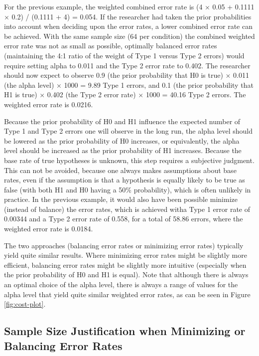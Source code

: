 \documentclass[
  english,
  ,man, a4paper,floatsintext]{apa6}
\begin{document}
For the previous example, the weighted combined error rate is (4 × 0.05 + 0.1111 × 0.2) / (0.1111 + 4) = 0.054. If the researcher had taken the prior probabilities into account when deciding upon the error rates, a lower combined error rate can be achieved. With the same sample size (64 per condition) the combined weighted error rate was not as small as possible, optimally balanced error rates (maintaining the 4:1 ratio of the weight of Type 1 versus Type 2 errors) would require setting alpha to 0.011 and the Type 2 error rate to 0.402. The researcher should now expect to observe 0.9 (the prior probability that H0 is true) × 0.011 (the alpha level) × 1000 = 9.89 Type 1 errors, and 0.1 (the prior probability that H1 is true) × 0.402 (the Type 2 error rate) × 1000 = 40.16 Type 2 errors. The weighted error rate is 0.0216.

Because the prior probability of H0 and H1 influence the expected number of Type 1 and Type 2 errors one will observe in the long run, the alpha level should be lowered as the prior probability of H0 increases, or equivalently, the alpha level should be increased as the prior probability of H1 increases. Because the base rate of true hypotheses is unknown, this step requires a subjective judgment. This can not be avoided, because one always makes assumptions about base rates, even if the assumption is that a hypothesis is equally likely to be true as false (with both H1 and H0 having a 50\% probability), which is often unlikely in practice. In the previous example, it would also have been possible minimize (instead of balance) the error rates, which is achieved witha Type 1 error rate of 0.00344 and a Type 2 error rate of 0.558, for a total of 58.86 errors, where the weighted error rate is 0.0184.

The two approaches (balancing error rates or minimizing error rates) typically yield quite similar results. Where minimizing error rates might be slightly more efficient, balancing error rates might be slightly more intuitive (especially when the prior probability of H0 and H1 is equal). Note that although there is always an optimal choice of the alpha level, there is always a range of values for the alpha level that yield quite similar weighted error rates, as can be seen in Figure \ref{fig:cost-plot}.

\hypertarget{sample-size-justification-when-minimizing-or-balancing-error-rates}{%
\subsection{Sample Size Justification when Minimizing or Balancing Error Rates}\label{sample-size-justification-when-minimizing-or-balancing-error-rates}}
\end{document}
